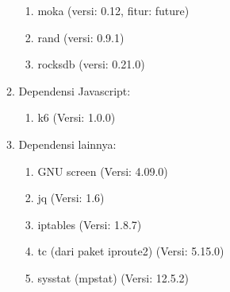 \begin{enumerate}
\begin{enumerate}
\begin{enumerate}
        \item moka (versi: 0.12, fitur: future)
        \item rand (versi: 0.9.1)
        \item rocksdb (versi: 0.21.0)
      \end{enumerate}
      \item Dependensi Javascript:
      \begin{enumerate}
        \item k6 (Versi: 1.0.0)
      \end{enumerate}
      \item Dependensi lainnya:
      \begin{enumerate}
        \item GNU screen (Versi: 4.09.0)
        \item jq (Versi: 1.6)
        \item iptables (Versi: 1.8.7)
        \item tc (dari paket iproute2) (Versi: 5.15.0)
        \item sysstat (mpstat) (Versi: 12.5.2)
      \end{enumerate}
    \end{enumerate}
\end{enumerate}